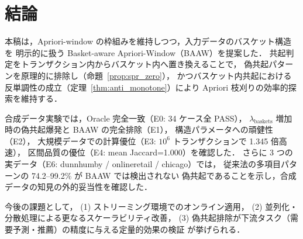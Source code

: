 \section{結論}
\label{sec:conclusion}

本稿は，Apriori-window の枠組みを維持しつつ，入力データのバスケット構造を
明示的に扱う Basket-aware Apriori-Window（BAAW）を提案した．
共起判定をトランザクション内からバスケット内へ置き換えることで，
偽共起パターンを原理的に排除し（命題~\ref{prop:spr_zero}），
かつバスケット内共起における反単調性の成立（定理~\ref{thm:anti_monotone}）により
Apriori 枝刈りの効率的探索を維持する．

合成データ実験では，Oracle 完全一致（E0: 34 ケース全 PASS），
$\lambda_{\text{baskets}}$ 増加時の偽共起爆発と BAAW の完全排除（E1），
構造パラメータへの頑健性（E2），
大規模データでの計算優位（E3: $10^6$ トランザクションで 1.345 倍高速），
区間品質の優位（E4: mean Jaccard=1.000）を確認した．
さらに 3 つの実データ（E6: dunnhumby / onlineretail / chicago）では，
従来法の多項目パターンの 74.2--99.2\% が BAAW では検出されない
偽共起であることを示し，合成データの知見の外的妥当性を確認した．

今後の課題として，
(1) ストリーミング環境でのオンライン適用，
(2) 並列化・分散処理による更なるスケーラビリティ改善，
(3) 偽共起排除が下流タスク（需要予測・推薦）の精度に与える定量的効果の検証
が挙げられる．
